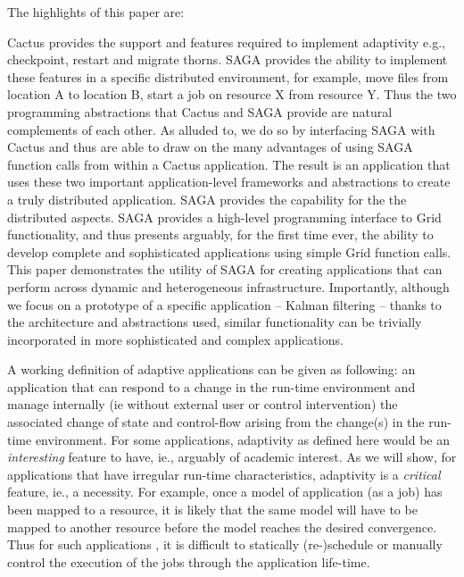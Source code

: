 \documentclass[conference,final]{IEEEtran}
\begin{document}
\noindent The highlights of this paper are:

Cactus provides the support and features required to implement
adaptivity e.g., checkpoint, restart and migrate thorns. SAGA provides
the ability to implement these features in a specific distributed
environment, for example, move files from location A to location B,
start a job on resource X from resource Y.  Thus the two programming
abstractions that Cactus and SAGA provide are natural complements of
each other.  As alluded to, we do so by interfacing SAGA with Cactus
and thus are able to draw on the many advantages of using SAGA
function calls from within a Cactus application.  The result is an
application that uses these two important application-level frameworks
and abstractions to create a truly distributed application.  SAGA
provides the capability for the the distributed aspects. SAGA provides
a high-level programming interface to Grid functionality, and thus
presents arguably, for the first time ever, the ability to develop
complete and sophisticated applications using simple Grid function
calls.  This paper demonstrates the utility of SAGA for creating
applications that can perform across dynamic and heterogeneous
infrastructure.  Importantly, although we focus on a prototype of a
specific application -- Kalman filtering -- thanks to the architecture
and abstractions used, similar functionality can be trivially
incorporated in more sophisticated and complex applications.

A working definition of adaptive applications can be given as
following: an application that can respond to a change in the run-time
environment and manage internally (ie without external user or control
intervention) the associated change of state and control-flow arising
from the change(s) in the run-time environment.  For some
applications, adaptivity as defined here would be an {\it interesting}
feature to have, ie., arguably of academic interest. As we will show,
for applications that have irregular run-time characteristics,
adaptivity is a {\it critical} feature, ie., a necessity.  For
example, once a model of application (as a job) has been mapped to a
resource, it is likely that the same model will have to be mapped to
another resource before the model reaches the desired convergence.
Thus for such applications , it is difficult to statically
(re-)schedule or manually control the execution of the jobs through
the application life-time.
\end{document}
